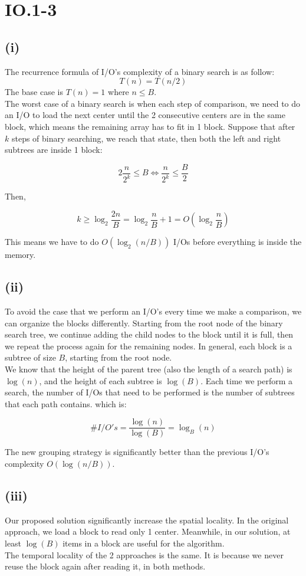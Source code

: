 \section*{IO.1-3}
\subsection*{(i)}

The recurrence formula of I/O's complexity of a binary search is as follow:
$$T(n) = T(n/2)$$
The base case is $T(n) = 1$ where $n \leq B$. \\

The worst case of a binary search is when each step of comparison, we need to do an I/O to load the next center until the 2 consecutive centers are in the same block, which means the remaining array has to fit in 1 block. Suppose that after $k$ steps of binary searching, we reach that state, then both the left and right subtrees are inside 1 block:

$$2 \frac{n}{2^k} \leq B \iff \frac{n}{2^k} \leq \frac{B}{2}$$

Then,

$$k \geq \log_2 \frac{2n}{B} = \log_2 \frac{n}{B} + 1 = O(\log_2 \frac{n}{B}) $$

This means we have to do $O(\log_2(n / B))$ I/Os before everything is inside the memory.

\subsection*{(ii)}
To avoid the case that we perform an I/O's every time we make a comparison, we can organize the blocks differently. Starting from the root node of the binary search tree, we continue adding the child nodes to the block until it is full, then we repeat the process again for the remaining nodes. In general, each block is a subtree of size $B$, starting from the root node.\\

We know that the height of the parent tree (also the length of a search path) is $\log(n)$, and the height of each subtree is $\log(B)$. Each time we perform a search, the number of I/Os that need to be performed is the number of subtrees that each path contains. which is:

$$\#I/O's = \frac{\log(n)}{\log(B)} = \log_B (n)$$

The new grouping strategy is significantly better than the previous I/O's complexity $O(\log(n/B))$.

\subsection*{(iii)}
Our proposed solution significantly increase the spatial locality. In the original approach, we load a block to read only 1 center. Meanwhile, in our solution, at least $\log(B)$ items in a block are useful for the algorithm.\\

The temporal locality of the 2 approaches is the same. It is because we never reuse the block again after reading it, in both methods.
